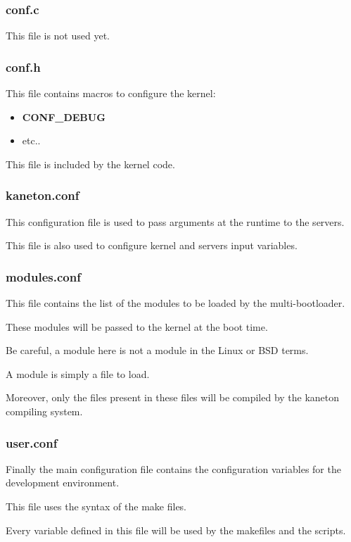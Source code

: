 
\begin{frame}
  \frametitle{conf.c}

  This file is not used yet.
\end{frame}


\begin{frame}
  \frametitle{conf.h}

  This file contains macros to configure the kernel:

  \begin{itemize}
    \item
      \textbf{CONF\_DEBUG}
    \item
      etc..
  \end{itemize}

  \nl

  This file is included by the kernel code.
\end{frame}


\begin{frame}
  \frametitle{kaneton.conf}

  This configuration file is used to pass arguments at the runtime to the
  servers.

  \nl

  This file is also used to configure kernel and servers input variables.
\end{frame}


\begin{frame}
  \frametitle{modules.conf}

  This file contains the list of the modules to be loaded by the
  multi-bootloader.

  \nl

  These modules will be passed to the kernel at the boot time.

  \nl

  Be careful, a module here is not a module in the Linux or BSD terms.

  \nl

  A module is simply a file to load.

  \nl

  Moreover, only the files present in these files will be compiled by
  the kaneton compiling system.
\end{frame}


\begin{frame}
  \frametitle{user.conf}

  Finally the main configuration file contains the configuration
  variables for the development environment.

  \nl

  This file uses the syntax of the make files.

  \nl

  Every variable defined in this file will be used by the makefiles
  and the scripts.
\end{frame}

